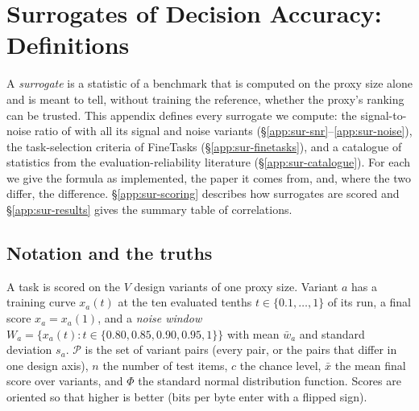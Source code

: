 
\section{Surrogates of Decision Accuracy: Definitions}
\label{app:surrogates}

A \emph{surrogate} is a statistic of a benchmark that is computed on the proxy size alone and is meant to tell, without training the reference, whether the proxy's ranking can be trusted.
This appendix defines every surrogate we compute: the signal-to-noise ratio of \citet{heineman_signal_2025} with all its signal and noise variants (\S\ref{app:sur-snr}--\ref{app:sur-noise}), the task-selection criteria of FineTasks (\S\ref{app:sur-finetasks}), and a catalogue of statistics from the evaluation-reliability literature (\S\ref{app:sur-catalogue}).
For each we give the formula as implemented, the paper it comes from, and, where the two differ, the difference.
\S\ref{app:sur-scoring} describes how surrogates are scored and \S\ref{app:sur-results} gives the summary table of correlations.

\subsection{Notation and the truths}
\label{app:sur-notation}

A task is scored on the $V$ design variants of one proxy size.
Variant $a$ has a training curve $x_a(t)$ at the ten evaluated tenths $t \in \{0.1,\dots,1\}$ of its run, a final score $x_a = x_a(1)$, and a \emph{noise window} $W_a = \{x_a(t) : t \in \{0.80, 0.85, 0.90, 0.95, 1\}\}$ with mean $\bar{w}_a$ and standard deviation $s_a$.
$\mathcal{P}$ is the set of variant pairs (every pair, or the pairs that differ in one design axis), $n$ the number of test items, $c$ the chance level, $\bar{x}$ the mean final score over variants, and $\Phi$ the standard normal distribution function.
Scores are oriented so that higher is better (bits per byte enter with a flipped sign).

